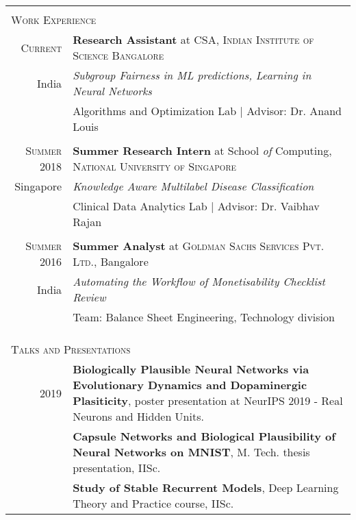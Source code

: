 \documentclass[a4paper,10pt]{article}
\begin{document}
\begin{tabularx}{\textwidth}{r|X}
\hline
\multicolumn{2}{c}{}\\
\multicolumn{2}{l}{\LARGE{\textsc{Work Experience}}}\\[2ex]
 \textsc{Current} & \textbf{Research Assistant} at \textsc{CSA, Indian Institute of Science Bangalore} \\India&\emph{Subgroup Fairness in ML predictions, Learning in Neural Networks}\\
 &\footnotesize{Algorithms and Optimization Lab} | Advisor: Dr. Anand Louis\\
 \multicolumn{2}{c}{} \\
 \textsc{Summer 2018} & \textbf{Summer Research Intern} at School \textit{of} Computing, \textsc{National University of Singapore} \\Singapore&\emph{Knowledge Aware Multilabel Disease Classification}\\
 &\footnotesize{Clinical Data Analytics Lab} | Advisor: Dr. Vaibhav Rajan\\
 \multicolumn{2}{c}{} \\
\textsc{Summer 2016} & \textbf{Summer Analyst} at \textsc{Goldman Sachs Services Pvt. Ltd.}, Bangalore\\
India& \emph{Automating the Workflow of Monetisability Checklist Review}\\
&\footnotesize{Team: Balance Sheet Engineering, Technology division}\\
\multicolumn{2}{c}{}\\
\multicolumn{2}{c}{}\\
\hline
\multicolumn{2}{c}{} \\










\multicolumn{2}{l}{\LARGE{\textsc{Talks and Presentations}}}\\[2ex]

2019 & 
\textbf{Biologically Plausible Neural Networks via Evolutionary Dynamics and Dopaminergic Plasiticity}, poster presentation at NeurIPS 2019 - Real Neurons and Hidden Units.\\[4ex]
&\textbf{Capsule Networks and Biological Plausibility of Neural Networks on MNIST}, M. Tech. thesis presentation, IISc.\\[4ex]
& \textbf{Study of Stable Recurrent Models}, Deep Learning Theory and Practice course, IISc.\\


\end{tabularx}
\end{document}

